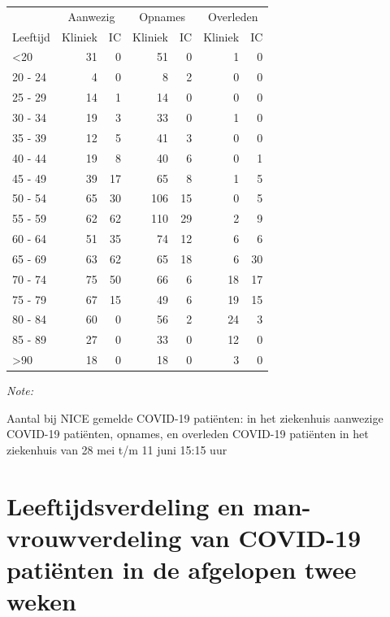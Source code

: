 \documentclass[
  english,
  man,floatsintext]{apa6}
\begin{document}
\begin{table}
\centering\begingroup\fontsize{10}{12}\selectfont

\begin{threeparttable}
\begin{tabular}{lrrrrrr}
\toprule
\multicolumn{1}{c}{ } & \multicolumn{2}{c}{Aanwezig} & \multicolumn{2}{c}{Opnames} & \multicolumn{2}{c}{Overleden} \\
\cmidrule(l{3pt}r{3pt}){2-3} \cmidrule(l{3pt}r{3pt}){4-5} \cmidrule(l{3pt}r{3pt}){6-7}
Leeftijd & Kliniek & IC & Kliniek & IC & Kliniek & IC\\
\midrule
<20 & 31 & 0 & 51 & 0 & 1 & 0\\
20 - 24 & 4 & 0 & 8 & 2 & 0 & 0\\
25 - 29 & 14 & 1 & 14 & 0 & 0 & 0\\
30 - 34 & 19 & 3 & 33 & 0 & 1 & 0\\
35 - 39 & 12 & 5 & 41 & 3 & 0 & 0\\
40 - 44 & 19 & 8 & 40 & 6 & 0 & 1\\
45 - 49 & 39 & 17 & 65 & 8 & 1 & 5\\
50 - 54 & 65 & 30 & 106 & 15 & 0 & 5\\
55 - 59 & 62 & 62 & 110 & 29 & 2 & 9\\
60 - 64 & 51 & 35 & 74 & 12 & 6 & 6\\
65 - 69 & 63 & 62 & 65 & 18 & 6 & 30\\
70 - 74 & 75 & 50 & 66 & 6 & 18 & 17\\
75 - 79 & 67 & 15 & 49 & 6 & 19 & 15\\
80 - 84 & 60 & 0 & 56 & 2 & 24 & 3\\
85 - 89 & 27 & 0 & 33 & 0 & 12 & 0\\
>90 & 18 & 0 & 18 & 0 & 3 & 0\\
\bottomrule
\end{tabular}
\begin{tablenotes}
\item \textit{Note: } 
\item Aantal bij NICE gemelde COVID-19 patiënten: in het ziekenhuis aanwezige COVID-19 patiënten, opnames, en overleden COVID-19 patiënten in het ziekenhuis van 28 mei t/m 11 juni 15:15 uur
\end{tablenotes}
\end{threeparttable}
\endgroup{}
\end{table}

\newpage

\hypertarget{leeftijdsverdeling-en-man-vrouwverdeling-van-covid-19-patiuxebnten-in-de-afgelopen-twee-weken}{%
\section{Leeftijdsverdeling en man-vrouwverdeling van COVID-19 patiënten in de afgelopen twee weken}\label{leeftijdsverdeling-en-man-vrouwverdeling-van-covid-19-patiuxebnten-in-de-afgelopen-twee-weken}}
\end{document}
